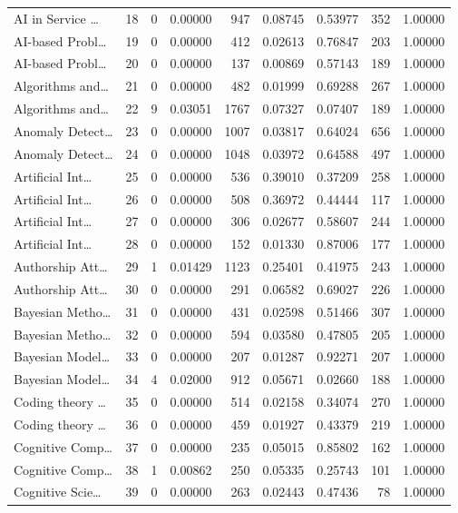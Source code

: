\begin{table}
\begin{tabular}{lrrrrrrrr}
AI in Service … & 18 & 0 & 0.00000 & 947 & 0.08745 & 0.53977 & 352 & 1.00000 \\
AI-based Probl… & 19 & 0 & 0.00000 & 412 & 0.02613 & 0.76847 & 203 & 1.00000 \\
AI-based Probl… & 20 & 0 & 0.00000 & 137 & 0.00869 & 0.57143 & 189 & 1.00000 \\
Algorithms and… & 21 & 0 & 0.00000 & 482 & 0.01999 & 0.69288 & 267 & 1.00000 \\
Algorithms and… & 22 & 9 & 0.03051 & 1767 & 0.07327 & 0.07407 & 189 & 1.00000 \\
Anomaly Detect… & 23 & 0 & 0.00000 & 1007 & 0.03817 & 0.64024 & 656 & 1.00000 \\
Anomaly Detect… & 24 & 0 & 0.00000 & 1048 & 0.03972 & 0.64588 & 497 & 1.00000 \\
Artificial Int… & 25 & 0 & 0.00000 & 536 & 0.39010 & 0.37209 & 258 & 1.00000 \\
Artificial Int… & 26 & 0 & 0.00000 & 508 & 0.36972 & 0.44444 & 117 & 1.00000 \\
Artificial Int… & 27 & 0 & 0.00000 & 306 & 0.02677 & 0.58607 & 244 & 1.00000 \\
Artificial Int… & 28 & 0 & 0.00000 & 152 & 0.01330 & 0.87006 & 177 & 1.00000 \\
Authorship Att… & 29 & 1 & 0.01429 & 1123 & 0.25401 & 0.41975 & 243 & 1.00000 \\
Authorship Att… & 30 & 0 & 0.00000 & 291 & 0.06582 & 0.69027 & 226 & 1.00000 \\
Bayesian Metho… & 31 & 0 & 0.00000 & 431 & 0.02598 & 0.51466 & 307 & 1.00000 \\
Bayesian Metho… & 32 & 0 & 0.00000 & 594 & 0.03580 & 0.47805 & 205 & 1.00000 \\
Bayesian Model… & 33 & 0 & 0.00000 & 207 & 0.01287 & 0.92271 & 207 & 1.00000 \\
Bayesian Model… & 34 & 4 & 0.02000 & 912 & 0.05671 & 0.02660 & 188 & 1.00000 \\
Coding theory … & 35 & 0 & 0.00000 & 514 & 0.02158 & 0.34074 & 270 & 1.00000 \\
Coding theory … & 36 & 0 & 0.00000 & 459 & 0.01927 & 0.43379 & 219 & 1.00000 \\
Cognitive Comp… & 37 & 0 & 0.00000 & 235 & 0.05015 & 0.85802 & 162 & 1.00000 \\
Cognitive Comp… & 38 & 1 & 0.00862 & 250 & 0.05335 & 0.25743 & 101 & 1.00000 \\
Cognitive Scie… & 39 & 0 & 0.00000 & 263 & 0.02443 & 0.47436 & 78 & 1.00000 \\

\end{tabular}
\end{table}
